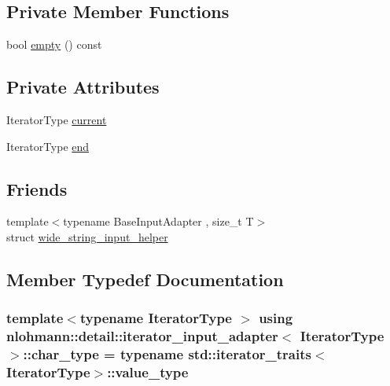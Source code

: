 \subsection*{Private Member Functions}
\begin{DoxyCompactItemize}
\item 
bool \hyperlink{classnlohmann_1_1detail_1_1iterator__input__adapter_a099b9c3eecd53d5be523d7a46e57c9fa}{empty} () const 
\end{DoxyCompactItemize}
\subsection*{Private Attributes}
\begin{DoxyCompactItemize}
\item 
Iterator\+Type \hyperlink{classnlohmann_1_1detail_1_1iterator__input__adapter_a8abccad27590d381a94e474b16161938}{current}
\item 
Iterator\+Type \hyperlink{classnlohmann_1_1detail_1_1iterator__input__adapter_a8aa29994ca6fdc0f8c96abf9151738ab}{end}
\end{DoxyCompactItemize}
\subsection*{Friends}
\begin{DoxyCompactItemize}
\item 
{\footnotesize template$<$typename Base\+Input\+Adapter , size\+\_\+t T$>$ }\\struct \hyperlink{classnlohmann_1_1detail_1_1iterator__input__adapter_ab86106ba230f1542b94dcd96e6ab3221}{wide\+\_\+string\+\_\+input\+\_\+helper}
\end{DoxyCompactItemize}


\subsection{Member Typedef Documentation}
\subsubsection[{\texorpdfstring{char\+\_\+type}{char_type}}]{\setlength{\rightskip}{0pt plus 5cm}template$<$typename Iterator\+Type $>$ using {\bf nlohmann\+::detail\+::iterator\+\_\+input\+\_\+adapter}$<$ Iterator\+Type $>$\+::{\bf char\+\_\+type} =  typename std\+::iterator\+\_\+traits$<$Iterator\+Type$>$\+::value\+\_\+type}\hypertarget{classnlohmann_1_1detail_1_1iterator__input__adapter_a7cc60e68767005322ab4b692c9dff283}{}\label{classnlohmann_1_1detail_1_1iterator__input__adapter_a7cc60e68767005322ab4b692c9dff283}


